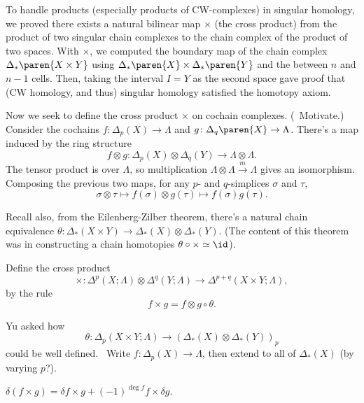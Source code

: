 To handle products (especially products of CW-complexes) in singular homology,
we proved there exists a natural bilinear map $\times$ (the cross product)
from the product of two singular chain complexes to the chain complex of the
product of two spaces. With $\times$, we computed the boundary map of the chain
complex ${\Delta}_{*}\paren{X \times Y}$ using ${\Delta}_{*}\paren{X} \times {\Delta}_{*}\paren{Y}$ 
and the  between $n$ and $n-1$ cells. 
Then, taking the interval $I = Y$ as the second space gave proof that (CW homology, and thus) singular homology satisfied the homotopy axiom.

Now we seek to define the cross product $\times$ on cochain complexes. (\TODO\ Motivate.) Consider the cochains $f\colon \Delta_p (X) \to \Lambda$ and $g \colon {\Delta}_{q}\paren{X} \to \Lambda$. There's a map induced by the ring structure
\[f \otimes g \colon \Delta_p(X) \otimes \Delta_q(Y) \to \Lambda \otimes \Lambda.\]
The tensor product is over $\Lambda$, so multiplication $\Lambda \otimes \Lambda \xrightarrow{m} \Lambda$ gives an isomorphism. Composing the previous two maps, for any $p$- and $q$-simplices $\sigma$ and $\tau$,
\[\sigma \otimes \tau \mapsto f(\sigma) \otimes g(\tau) \mapsto f(\sigma) g(\tau).\] 

Recall also, from the Eilenberg-Zilber theorem, there's a natural chain equivalence $\theta \colon \Delta_*(X \times Y) \to \Delta_*(X) \otimes \Delta_*(Y)$. (The content of this theorem was in constructing a chain homotopies $\theta \circ \times \simeq \id$).

\begin{defn}
Define the cross product
\[\times \colon \Delta^p (X; \Lambda) \otimes \Delta^q (Y; \Lambda) \to \Delta^{p+q}(X\times Y; \Lambda),\]
by the rule
\[f \times g = f\otimes g \circ \theta.\]
\end{defn}

\begin{rem}[]
    Yu asked how 
    \[\theta \colon \Delta_p(X\times Y; \Lambda) \to (\Delta_*(X) \otimes \Delta_*(Y))_p\] 
    could be well defined. 
    \TODO\ Write $f \colon \Delta_p(X) \to \Lambda$, then extend to all of $\Delta_*(X)$ (by varying $p$?).
\end{rem}

\begin{lem}[]
$\delta (f \times g)  = \delta f \times g + (-1)^{\deg f} f \times \delta g$.
\end{lem}

